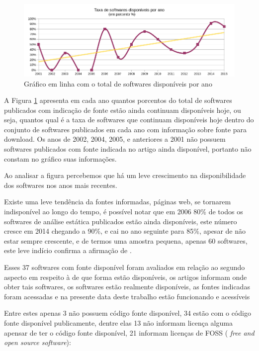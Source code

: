 \begin{figure}[h]
  \center
  \includegraphics[scale=0.65]{imagens/softwares-disponivel-por-ano.png}
  \caption{Gráfico em linha com o total de softwares disponíveis por ano}
  \label{softwares-disponivel-por-ano}
\end{figure}

A Figura \ref{softwares-disponivel-por-ano} apresenta em cada ano quantos
porcentos do total de softwares publicados com indicação de fonte estão ainda continuam
disponíveis hoje, ou seja, quantos qual é a taxa de softwares que continuam
disponíveis hoje dentro do conjunto de softwares publicados em cada ano com
informação sobre fonte para download.  Os anos de 2002, 2004, 2005, e
anteriores a 2001 não possuem softwares publicados com fonte indicada no artigo
ainda disponível, portanto não constam no gráfico suas informações.

Ao analisar a figura percebemos que há um leve crescimento na disponibilidade
dos softwares nos anos mais recentes.

Existe uma leve tendência da fontes informadas, páginas web, se tornarem
indisponível ao longo do tempo, é possível notar que em 2006 80\% de todos os
softwares de análise estática publicados estão ainda disponíveis, este número
cresce em 2014 chegando a 90\%, e cai no ano seguinte para 85\%, apesar de não
estar sempre crescente, e de termos uma amostra pequena, apenas 60 softwares,
este leve indício confirma a afirmação de .

Esses 37 softwares com fonte disponível foram avaliados em relação ao segundo
aspecto em respeito à de que forma estão disponíveis, os artigos informam onde
obter tais softwares, os softwares estão realmente disponíveis, as fontes
indicadas foram acessadas e na presente data deste trabalho estão funcionando e
acessíveis

Entre estes apenas 3 não possuem código fonte disponível, 34 estão com o código
fonte disponível publicamente, dentre elas 13 não informam licença alguma
apensar de ter o código fonte disponível, 21 informam licenças de FOSS ({\it
free and open source software}):

